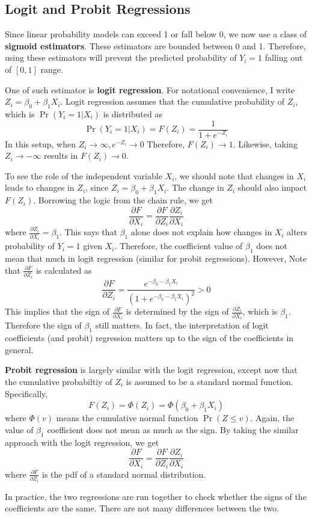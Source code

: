 \documentclass[12pt]{article}
\theoremstyle{definition}
\theoremstyle{property}
\theoremstyle{assumption}
\theoremstyle{example}
\theoremstyle{comment}
\begin{document}
\subsection{Logit and Probit Regressions}
Since linear probability models can exceed 1 or fall below 0, we now use a class of \textbf{sigmoid estimators}. These estimators are bounded between 0 and 1. Therefore, using these estimators will prevent the predicted probability of $Y_i=1$ falling out of $[0,1]$ range. \par\medskip
One of such estimator is \textbf{logit regression}. For notational convenience, I write $Z_i=\beta_0+\beta_1X_i$. Logit regression assumes that the cumulative probability of $Z_i$, which is $\Pr(Y_i=1|X_i)$  is distributed as
\[
\Pr(Y_i=1|X_i)=F(Z_i)=\frac{1}{1+e^{-Z_i}}
\]
In this setup, when $Z_i\to\infty, e^{-Z_i}\to0$ Therefore, $F(Z_i)\to1$. Likewise, taking $Z_i\to-\infty$ results in $F(Z_i)\to0$. \par\medskip
To see the role of the independent variable $X_i$, we should note that changes in $X_i$ leads to changes in $Z_i$, since $Z_i = \beta_0+\beta_1X_i$. The change in $Z_i$ should also impact $F(Z_i)$. Borrowing the logic from the chain rule, we get
\[
\frac{\partial F}{\partial X_i} = \frac{\partial F}{\partial Z_i}\frac{\partial Z_i}{\partial X_i}  
\]
where $\frac{\partial Z_i}{\partial X_i}  =\beta_1$. This says that $\beta_1$ alone does not explain how changes in $X_i$ alters probability of $Y_i=1$ given $X_i$.  Therefore, the coefficient value of $\beta_1$ does not mean that much in logit regression (similar for probit regressions). However, Note that $ \frac{\partial F}{\partial Z_i}$ is calculated as
\[
 \frac{\partial F}{\partial Z_i}=\frac{e^{-\beta_0 -\beta_1X_i}}{(1+e^{-\beta_0 -\beta_1X_i})^2} >0
\]
This implies that the sign of $\frac{\partial F}{\partial X_i}$ is determined by the sign of $\frac{\partial Z_i}{\partial X_i} $, which is $\beta_1$. Therefore the sign of $\beta_1$ still matters. In fact, the interpretation of logit coefficients (and probit) regression matters up to the sign of the coefficients in general. \par\medskip
\textbf{Probit regression} is largely similar with the logit regression, except now that the cumulative probabiltiy of $Z_i$ is assumed to be a standard normal function. Specifically, 
\[
F(Z_i)= \Phi(Z_i)=\Phi(\beta_0+\beta_1X_i)
\]
where $\Phi(v)$ means the cumulative normal function $\Pr(Z\leq v)$. Again, the value of $\beta_1$ coefficient does not mean as much as the sign. By taking the similar approach with the logit regression, we get
\[
\frac{\partial F}{\partial X_i} = \frac{\partial F}{\partial Z_i}\frac{\partial Z_i}{\partial X_i} 
\]
 where $\frac{\partial F}{\partial Z_i}$ is the pdf of a standard normal distribution. \par\medskip
In practice, the two regressions are run together to check whether the signs of the coefficients are the same. There are not many differences between the two.\par\medskip
\end{document}
